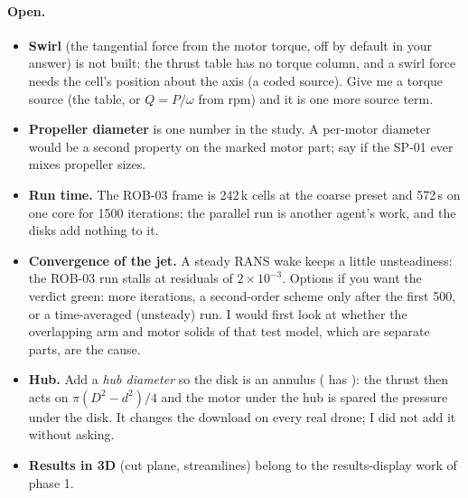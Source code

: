 \paragraph{Open.}
\begin{itemize}[nosep]
  \item \textbf{Swirl} (the tangential force from the motor torque, off by default in your answer) is not built: the
        thrust table has no torque column, and a swirl force needs the cell's position about the axis (a coded
        source). Give me a torque source (the table, or $Q=P/\omega$ from rpm) and it is one more source term.
  \item \textbf{Propeller diameter} is one number in the study. A per-motor diameter would be a second property on
        the marked motor part; say if the SP-01 ever mixes propeller sizes.
  \item \textbf{Run time.} The ROB-03 frame is 242\,k cells at the coarse preset and 572\,s on one core for 1500 iterations; the
        parallel run is another agent's work, and the disks add nothing to it.
  \item \textbf{Convergence of the jet.} A steady RANS wake keeps a little unsteadiness: the ROB-03 run stalls at
        residuals of $2\times10^{-3}$. Options if you want the verdict green: more iterations, a second-order
        scheme only after the first 500, or a time-averaged (unsteady) run. I would first look at whether the
        overlapping arm and motor solids of that test model, which are separate parts, are the cause.
  \item \textbf{Hub.} Add a \emph{hub diameter} so the disk is an annulus ( has ):
        the thrust then acts on $\pi(D^2-d^2)/4$ and the motor under the hub is spared the pressure under the disk. It
        changes the download on every real drone; I did not add it without asking.
  \item \textbf{Results in 3D} (cut plane, streamlines) belong to the results-display work of phase 1.
\end{itemize}

